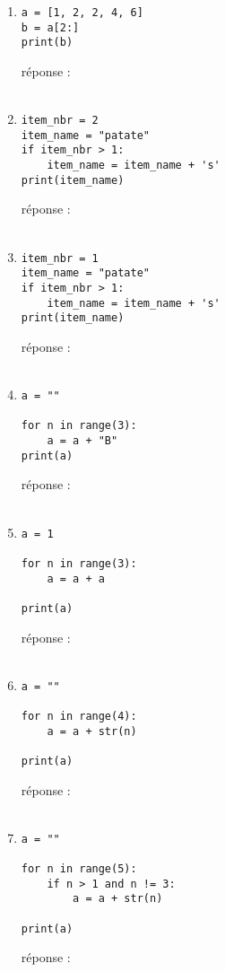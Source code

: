 \documentclass[12pt,a4paper]{article}
\newcommand{\response}{réponse : \hrulefill\\\\}
\begin{document}
\begin{enumerate}
\item
\begin{lstlisting}
a = [1, 2, 2, 4, 6]
b = a[2:]
print(b) 
\end{lstlisting}
\response %
\pagebreak

\item
\begin{lstlisting}
item_nbr = 2
item_name = "patate"
if item_nbr > 1:
	item_name = item_name + 's'
print(item_name)

\end{lstlisting}
\response %

\item
\begin{lstlisting}
item_nbr = 1
item_name = "patate"
if item_nbr > 1:
	item_name = item_name + 's'
print(item_name)

\end{lstlisting}
\response %

\item
\begin{lstlisting}
a = ""

for n in range(3):
	a = a + "B"
print(a)
\end{lstlisting}
\response %

\item
\begin{lstlisting}
a = 1

for n in range(3):
	a = a + a

print(a)
\end{lstlisting}
\response %

\pagebreak
\item
\begin{lstlisting}
a = ""

for n in range(4):
	a = a + str(n)
	
print(a)
\end{lstlisting}
\response %

\item
\begin{lstlisting}
a = ""

for n in range(5):
	if n > 1 and n != 3: 
		a = a + str(n)
	
print(a)
\end{lstlisting}
\response %

\end{enumerate}
\end{document}
